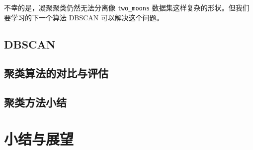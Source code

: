 不幸的是，凝聚聚类仍然无法分离像 \verb|two_moons| 数据集这样复杂的形状。但我们要学习的下一个算法 DBSCAN 可以解决这个问题。
\subsection{DBSCAN}
\subsection{聚类算法的对比与评估}
\subsection{聚类方法小结}
\section{小结与展望}